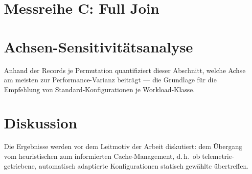 \section{Messreihe C: Full Join}\label{sec:result-c}

% 

\section{Achsen-Sensitivitätsanalyse}\label{sec:sensitivity}

Anhand der Records je Permutation quantifiziert dieser Abschnitt, welche Achse am meisten zur
Performance-Varianz beiträgt --- die Grundlage für die Empfehlung von Standard-Konfigurationen
je Workload-Klasse.

\section{Diskussion}\label{sec:discussion}

Die Ergebnisse werden vor dem Leitmotiv der Arbeit diskutiert: dem Übergang vom heuristischen
zum informierten Cache-Management, d.\,h.\ ob telemetrie-getriebene, automatisch adaptierte
Konfigurationen statisch gewählte übertreffen.
